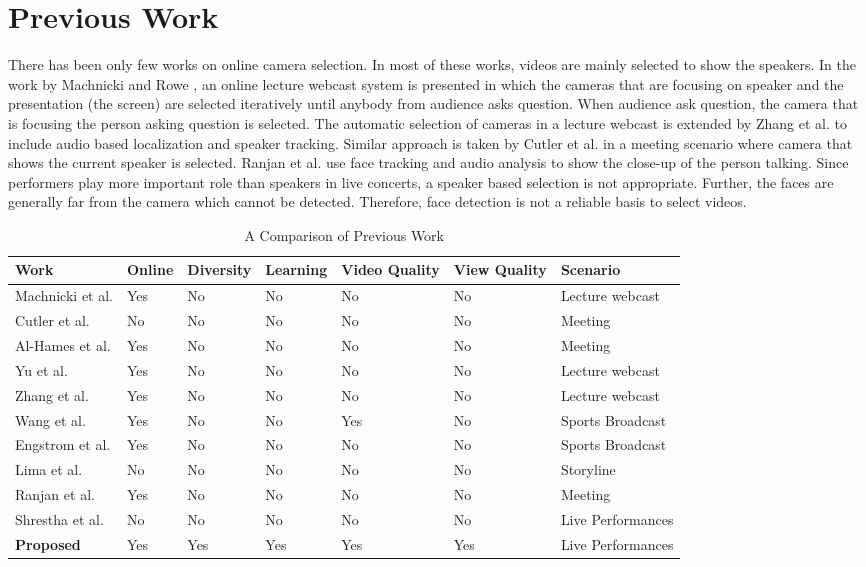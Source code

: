 \documentclass{sig-alternate}
\begin{document}
\section{Previous Work}\label{previous}
There has been only few works on online camera selection. In
most of these works, videos are mainly selected to show the speakers.
In the work by Machnicki and Rowe \cite{9}, an online lecture
webcast system is presented in which the cameras that are focusing
on speaker and the presentation (the screen) are selected iteratively
until anybody from audience asks question. When audience ask
question, the camera that is focusing the person asking question is
selected. The automatic selection of cameras in a lecture webcast
is extended by Zhang et al. \cite{21} to include audio based localization
and speaker tracking. Similar approach is taken by Cutler et al. \cite{6}
in a meeting scenario where camera that shows the current speaker
is selected. Ranjan et al. \cite{12} use face tracking and audio analysis
to show the close-up of the person talking. Since performers
play more important role than speakers in live concerts, a speaker
based selection is not appropriate. Further, the faces are generally
far from the camera which cannot be detected. Therefore, face detection
is not a reliable basis to select videos.

\begin{table}
\fontsize{6}{10}\selectfont
\centering
\caption{A Comparison of Previous Work}
\label{table1}
\begin{tabularx}{\textwidth}{p{3cm}|X|X|X|X|X|p{3cm}}

\hline
Work & Online & Diversity & Learning & Video Quality  & View Quality & Scenario\\
\hline
Machnicki et al.\cite{9} & Yes & No & No & No  & No & Lecture webcast\\
\hline
Cutler et al. \cite{6} & No &  No & No  & No  & No & Meeting\\
\hline
Al-Hames et al. \cite{3} & Yes & No &  No  & No & No &  Meeting\\
\hline
Yu et al. & Yes \cite{20}& No & No  & No  & No & Lecture webcast\\
\hline
Zhang et al. \cite{21}& Yes & No &  No  & No  & No & Lecture webcast\\
\hline
Wang et al. \cite{16}& Yes & No & No  & Yes  & No & Sports Broadcast\\
\hline
Engstrom et al. \cite{8} & Yes & No & No  & No  & No & Sports Broadcast\\
\hline
Lima et al. \cite{7}& No & No & No  & No  & No & Storyline\\
\hline
Ranjan et al. \cite{12}& Yes & No & No  & No  & No & Meeting\\
\hline
Shrestha et al. \cite{15}& No & No & No  & No  & No & Live Performances\\
\hline
\textbf{Proposed} & Yes & Yes & Yes  & Yes  & Yes & Live Performances\\
\hline
\end{tabularx}
\end{table}
\end{document}
